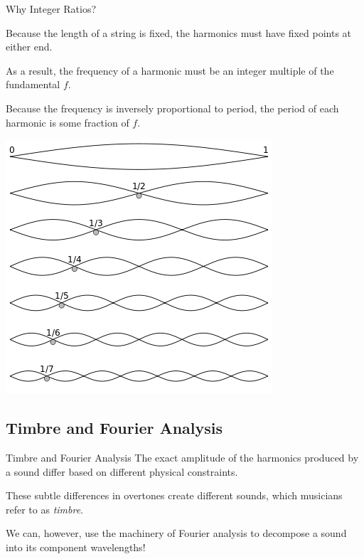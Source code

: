 \documentclass{beamer}
\begin{document}
\begin{frame}{Why Integer Ratios?}
    \begin{minipage}{.49\textwidth}
        \pause Because the length of a string is fixed, the harmonics must have fixed points at either end.
        
        \pause As a result, the frequency of a harmonic must be an integer multiple of the fundamental $f$.
        
        \pause Because the frequency is inversely proportional to period, the period of each harmonic is some fraction of $f$.
    \end{minipage}
    \begin{minipage}{.49\textwidth}
        \includegraphics[width=\textwidth]{harmonic-series.png}
    \end{minipage}
\end{frame}

\subsection{Timbre and Fourier Analysis}
\begin{frame}{Timbre and Fourier Analysis}
    \pause The exact amplitude of the harmonics produced by a sound differ based on different physical constraints.
    
    \pause These subtle differences in overtones create different sounds, which musicians refer to as \textit{timbre}.
    
    \pause We can, however, use the machinery of Fourier analysis to decompose a sound into its component wavelengths!
\end{frame}
\end{document}
